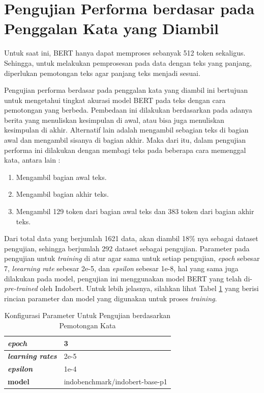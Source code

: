 \section{Pengujian Performa berdasar pada Penggalan Kata yang Diambil}

Untuk saat ini, BERT hanya dapat memproses sebanyak 512 token sekaligus. Sehingga, untuk melakukan pemprosesan pada data dengan teks yang panjang, diperlukan pemotongan teks agar panjang teks menjadi sesuai.

Pengujian performa berdasar pada penggalan kata yang diambil ini bertujuan untuk mengetahui tingkat akurasi model BERT pada teks dengan cara pemotongan yang berbeda. Pembedaan ini dilakukan berdasarkan pada adanya berita yang menuliskan kesimpulan di awal, atau bisa juga menuliskan kesimpulan di akhir. Alternatif lain adalah mengambil sebagian teks di bagian awal dan mengambil sisanya di bagian akhir. Maka dari itu, dalam pengujian performa ini dilakukan dengan membagi teks pada beberapa cara memenggal kata, antara lain :

\begin{enumerate}[nolistsep]
    \item Mengambil bagian awal teks.
    \item Mengambil bagian akhir teks.
    \item Mengambil 129 token dari bagian awal teks dan 383 token dari bagian akhir teks.
\end{enumerate}

Dari total data yang berjumlah 1621 data, akan diambil 18\% nya sebagai dataset pengujian, sehingga berjumlah 292 dataset sebagai pengujian. Parameter pada pengujian untuk \textit{training} di atur agar sama untuk setiap pengujian, \textit{epoch} sebesar 7, \textit{leearning rate} sebesar 2e-5, dan \textit{epsilon} sebesar 1e-8, hal yang sama juga dilakukan pada model, pengujian ini menggunakan model BERT yang telah di-\textit{pre-trained} oleh Indobert. Untuk lebih jelasnya, silahkan lihat Tabel \ref{tab: truncate_param} yang berisi rincian parameter dan model yang digunakan untuk proses \textit{training}.

\begin{table}[h]
    \caption{Konfigurasi Parameter Untuk Pengujian berdasarkan Pemotongan Kata}
    \label{tab: truncate_param}
    \centering
    \begin{tabular}{|l|l|}
        \hline
        \textit{\textbf{epoch}}          & 3                              \\ \hline
        \textit{\textbf{learning rates}} & 2e-5                           \\ \hline
        \textit{\textbf{epsilon}}        & 1e-4                           \\ \hline
        \textbf{model}                   & indobenchmark/indobert-base-p1 \\ \hline
    \end{tabular}
\end{table}


